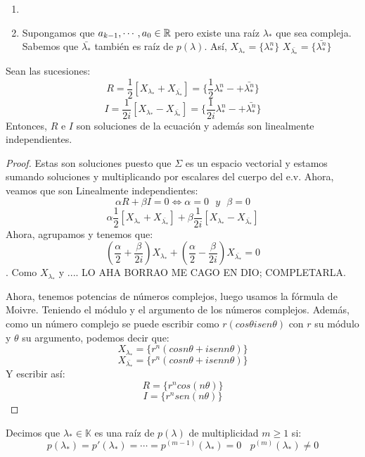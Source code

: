         \begin{enumerate}
	\item
	\item Supongamos que $a_{k-1},\cdots,a_0\in \mathbb{R}$ pero existe una raíz
          $\lambda_*$ que sea compleja. Sabemos que $\bar{\lambda_*}$ también es
          raíz de $p(\lambda)$. Así, $X_{\lambda_*}= \{\lambda_*^n\}$
          $X_{\bar{\lambda_*}}= \{\bar{\lambda_*^n}\}$
        \end{enumerate}

\begin{nprop}[Lema]
  Sean las sucesiones:
$$ R= \dfrac{1}{2} [X_{\lambda_*}+ X_{\bar{\lambda_*}}] = \{\dfrac{1}{2}\lambda_*^n -+\bar{\lambda_*^n}\}$$
$$ I = \dfrac{1}{2i}[X_{\lambda_*} -X_{\bar{\lambda_*}}] = \{\dfrac{1}{2i}\lambda_*^n -+\bar{\lambda_*^n}\}$$
Entonces, $R$ e $I$ son soluciones de la ecuación y además son linealmente
independientes.
\end{nprop}
\begin{proof}
  Estas son soluciones puesto que $\Sigma$ es un espacio vectorial y estamos
  sumando soluciones y multiplicando por escalares del cuerpo del e.v.  Ahora,
  veamos que son Linealmente independientes:
	$$ \alpha R + \beta I = 0 \iff \alpha = 0 \ \ \ y \ \ \ \beta  = 0$$
	$$ \alpha \dfrac{1}{2} [X_{\lambda_*}+ X_{\bar{\lambda_*}}]  + \beta \dfrac{1}{2i}[X_{\lambda_*} -X_{\bar{\lambda_*}}]$$
	Ahora, agrupamos y tenemos que:
	$$ (\dfrac{\alpha}{2} + \dfrac{\beta}{2i}) X_{\lambda_*} + (\dfrac{\alpha}{2} - \dfrac{\beta}{2i}) X_{\bar{\lambda_*}} = 0$$.
	Como $X_{\lambda_*}$ y .... LO AHA BORRAO ME CAGO EN DIO; COMPLETARLA.

	Ahora, tenemos potencias de números complejos, luego usamos la fórmula
        de Moivre. Teniendo el módulo y el argumento de los números
        complejos. Además, como un número complejo se puede escribir como
        $r(cos \theta i sen\theta)$ con $r$ su módulo y $\theta$ su argumento,
        podemos decir que:
	$$X_{\lambda_*}= \{r^n(cos n\theta + i sen n \theta)\} $$
	$$ X_{\bar{\lambda_*}}= \{r^n(cos n\theta + i sen n \theta)\} $$
	Y escribir así:
	$$ R = \{r^n cos (n\theta)\}$$
	$$ I = \{r^n sen (n\theta)\}$$
      \end{proof}


\begin{ndef}
  Decimos que $\lambda_* \in \mathbb K$ es una raíz de $p(\lambda)$ de
  multiplicidad $m\geq 1$ si:
	$$ p(\lambda_*) = p'(\lambda_*) =  \cdots = p^{(m-1)}(\lambda_*) = 0 \ \ \ \ p^{(m)}(\lambda_*) \ne 0 $$
      \end{ndef}

